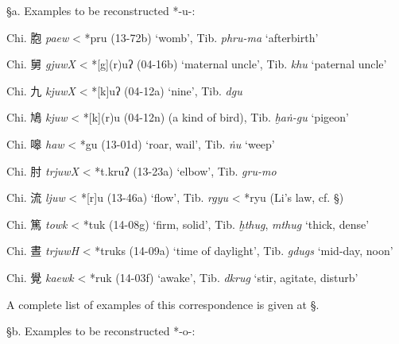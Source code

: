 §a. Examples to be reconstructed *-u-:

\begin{description} \item
Chi. 胞 \emph{paew} \textless{} *p{}ru (13-72b) `womb', Tib. {} \emph{phru-ma} `afterbirth'
 \item
Chi. 舅 \emph{gjuwX} \textless{} *[g](r)uʔ (04-16b) `maternal
uncle', Tib. {} \emph{khu} `paternal uncle'
\item
Chi. 九 \emph{kjuwX} \textless{} *[k]uʔ (04-12a) `nine', Tib. {} \emph{dgu}
\item
Chi. 鳩 \emph{kjuw} \textless{} *[k](r)u (04-12n) (a kind of bird),
Tib. {} \emph{ḫaṅ-gu} `pigeon'
\item
Chi. 嗥 \emph{haw} \textless{} *g{}u (13-01d) `roar, wail', Tib. {} \emph{ṅu} `weep'
\item
Chi. 肘 {\emph{trjuwX}} \textless{} *t.kruʔ (13-23a) `elbow', Tib. {} \emph{gru-mo}
\item
Chi. 流 \emph{ljuw} \textless{} *[r]u (13-46a) `flow', Tib. {} \emph{rgyu} \textless{} *ryu (Li's law, cf. §)
\item
Chi. 篤  \emph{towk} \textless{} *t{}uk (14-08g) `firm, solid', Tib. {} \emph{ḫthug}, {} \emph{mthug} `thick, dense'
\item
Chi. 晝  \emph{trjuwH} \textless{} *truks (14-09a) `time of daylight',
Tib. {} \emph{gdugs} `mid-day, noon'
\item
Chi. 覺  \emph{kaewk} \textless{} *{}ruk (14-03f) `awake', Tib. {} \emph{dkrug} `stir, agitate, disturb'
\end{description}

A complete list of examples of this correspondence is given at §.

§b. Examples to be reconstructed *-o-:

